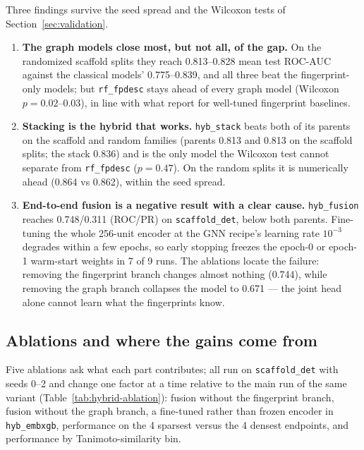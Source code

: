 \documentclass[conference]{IEEEtran}
\newcommand{\code}[1]{\texttt{\small #1}}
\begin{document}
Three findings survive the seed spread and the Wilcoxon tests of
Section~\ref{sec:validation}.

\begin{enumerate}
\item \textbf{The graph models close most, but not all, of the gap.} On the randomized scaffold
splits they reach 0.813--0.828 mean test ROC-AUC against the classical models' 0.775--0.839, and
all three beat the fingerprint-only models; but \code{rf\_fpdesc} stays ahead of every graph
model (Wilcoxon $p=0.02$--$0.03$), in line with what \citet{yang2019analyzing} report for
well-tuned fingerprint baselines.
\item \textbf{Stacking is the hybrid that works.} \code{hyb\_stack} beats both of its parents on
the scaffold and random families (parents 0.813 and 0.813 on the scaffold splits; the stack
0.836) and is the only model the Wilcoxon test cannot separate from \code{rf\_fpdesc}
($p=0.47$). On the random splits it is numerically ahead (0.864 vs 0.862), within the seed
spread.
\item \textbf{End-to-end fusion is a negative result with a clear cause.} \code{hyb\_fusion}
reaches 0.748/0.311 (ROC/PR) on \code{scaffold\_det}, below both parents. Fine-tuning the whole
256-unit encoder at the GNN recipe's learning rate $10^{-3}$ degrades within a few epochs, so
early stopping freezes the epoch-0 or epoch-1 warm-start weights in 7 of 9 runs. The ablations
locate the failure: removing the fingerprint branch changes almost nothing (0.744), while
removing the graph branch collapses the model to 0.671 --- the joint head alone cannot learn
what the fingerprints know.
\end{enumerate}

\subsection{Ablations and where the gains come from}
\label{sec:hybrid-ablation}
Five ablations ask what each part contributes; all run on \code{scaffold\_det} with seeds 0--2
and change one factor at a time relative to the main run of the same variant
(Table~\ref{tab:hybrid-ablation}): fusion without the fingerprint branch, fusion without the
graph branch, a fine-tuned rather than frozen encoder in \code{hyb\_embxgb}, performance on the
4 sparsest versus the 4 densest endpoints, and performance by Tanimoto-similarity bin.
\end{document}
